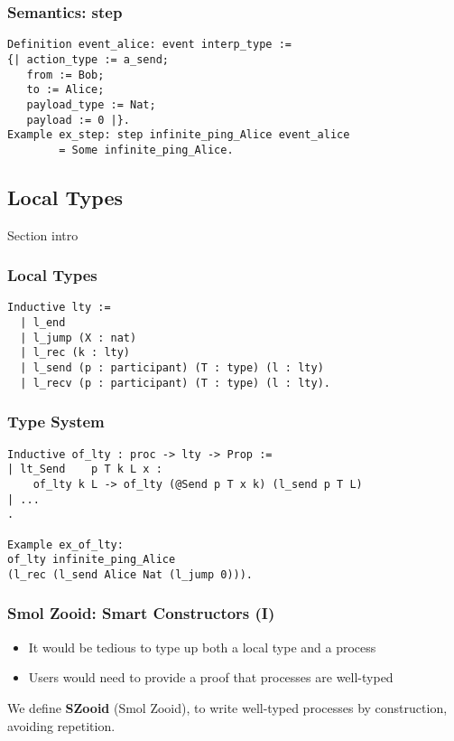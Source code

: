 \begin{frame}[fragile]
    \frametitle{Semantics: step}
	\begin{verbatim}
Definition event_alice: event interp_type := 
{| action_type := a_send;
   from := Bob;
   to := Alice;
   payload_type := Nat;
   payload := 0 |}.
Example ex_step: step infinite_ping_Alice event_alice
		= Some infinite_ping_Alice.
	\end{verbatim}
\end{frame}

\subsection{Local Types}
\begin{frame}{Section intro}
\end{frame}

\begin{frame}[fragile]
    \frametitle{Local Types}
    \begin{verbatim}
Inductive lty :=
  | l_end
  | l_jump (X : nat)
  | l_rec (k : lty)
  | l_send (p : participant) (T : type) (l : lty)
  | l_recv (p : participant) (T : type) (l : lty).
    \end{verbatim}
\end{frame}

\begin{frame}[fragile]
    \frametitle{Type System}
    \begin{verbatim}
Inductive of_lty : proc -> lty -> Prop :=
| lt_Send    p T k L x :
    of_lty k L -> of_lty (@Send p T x k) (l_send p T L)
| ...
.

Example ex_of_lty:
of_lty infinite_ping_Alice
(l_rec (l_send Alice Nat (l_jump 0))).
    \end{verbatim}
\end{frame}

\begin{frame}[fragile]
    \frametitle{Smol Zooid: Smart Constructors (I)}
    \begin{sticky}
\vspace{-.5cm}
    \begin{itemize}
        \item It would be tedious to type up both a local type and a process
        \item Users would need to provide a proof that processes are well-typed
    \end{itemize}
    \end{sticky}
    \begin{greenbox}{}
        We define \textbf{SZooid} (Smol Zooid), to write
well-typed processes by construction, avoiding repetition.
    \end{greenbox}
\end{frame}

